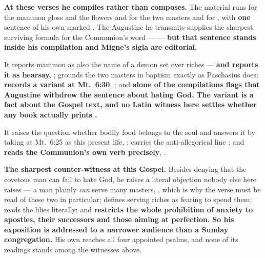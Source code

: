 \begin{witnessnote}
\textbf{At these verses he compiles rather than composes.} The material runs
 for the mammon gloss and the flowers and  for the
two masters and for , with \textbf{one} sentence of his
own marked . The Augustine he transmits supplies
the sharpest surviving formula for the Communion's word ---  --- \textbf{but that sentence stands inside his compilation and
Migne's sigla are editorial.}
\end{witnessnote}

\begin{witnessnote}
 It reports mammon as also the name of a demon set over riches ---
\textbf{and reports it as hearsay, };
grounds the two masters in baptism exactly
as Paschasius does; \textbf{records a variant at Mt.\ 6:30}, ; and \textbf{alone of
the compilations flags that Augustine withdrew the sentence about hating God.}
\textbf{The variant is a fact about the Gospel text, and no Latin witness here
settles whether any book actually prints .}
\end{witnessnote}

\begin{witnessnote}
It raises the question whether bodily food belongs
to the soul and answers it by taking  at Mt.\ 6:25 as this present
life, ; carries the
anti-allegorical line ; and \textbf{reads the Communion's own verb precisely},
.
\end{witnessnote}

\begin{witnessnote}
\textbf{The sharpest counter-witness
at this Gospel.} Besides denying that the covetous man can fail to hate God,
he raises a literal objection nobody else here raises --- a man plainly
\emph{can} serve many masters, , which is why the verse must be read of
these two in particular; defines serving riches as fearing to spend them; reads
the lilies literally; and \textbf{restricts the whole prohibition of anxiety to
apostles, their successors and those aiming at perfection.} \textbf{So his exposition is
addressed to a narrower audience than a Sunday congregation.} His own
 reaches all four appointed psalms, and none of its
readings stands among the witnesses above.
\end{witnessnote}

